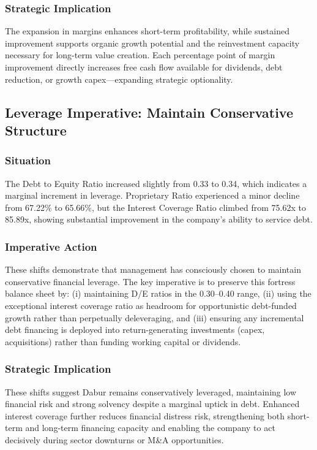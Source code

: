 \documentclass[12pt, a4paper]{report}
\begin{document}
\subsubsection{Strategic Implication}
The expansion in margins enhances short-term profitability, while sustained improvement supports organic growth potential and the reinvestment capacity necessary for long-term value creation. Each percentage point of margin improvement directly increases free cash flow available for dividends, debt reduction, or growth capex—expanding strategic optionality.

\subsection{Leverage Imperative: Maintain Conservative Structure}

\subsubsection{Situation}
The Debt to Equity Ratio increased slightly from 0.33 to 0.34, which indicates a marginal increment in leverage. Proprietary Ratio experienced a minor decline from 67.22\% to 65.66\%, but the Interest Coverage Ratio climbed from 75.62x to 85.89x, showing substantial improvement in the company's ability to service debt.

\subsubsection{Imperative Action}
These shifts demonstrate that management has consciously chosen to maintain conservative financial leverage. The key imperative is to preserve this fortress balance sheet by: (i) maintaining D/E ratios in the 0.30–0.40 range, (ii) using the exceptional interest coverage ratio as headroom for opportunistic debt-funded growth rather than perpetually deleveraging, and (iii) ensuring any incremental debt financing is deployed into return-generating investments (capex, acquisitions) rather than funding working capital or dividends.

\subsubsection{Strategic Implication}
These shifts suggest Dabur remains conservatively leveraged, maintaining low financial risk and strong solvency despite a marginal uptick in debt. Enhanced interest coverage further reduces financial distress risk, strengthening both short-term and long-term financing capacity and enabling the company to act decisively during sector downturns or M\&A opportunities.
\end{document}
